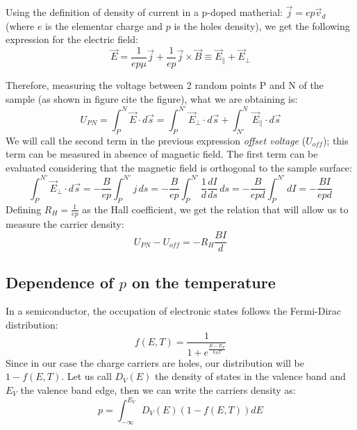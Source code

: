 \documentclass[11pt,a4paper]{article}
\begin{document}
Using the definition of density of current in a p-doped matherial: $\vec{j}=ep\vec{v}_d$ (where $e$ is the elementar charge and $p$ is the holes density), we get the following expression for the electric field:
\begin{equation}
\vec{E}=\frac{1}{ep\mu}\vec{j}+\frac{1}{ep}\vec{j}\times\vec{B}\equiv \vec{E}_\parallel+\vec{E}_\perp
\end{equation}

Therefore, measuring the voltage between 2 random points P and N of the sample (as shown in figure {\tiny cite the figure}), what we are obtaining is:
\begin{equation}
U_{PN}=\int_P^N\vec{E}\cdot d\vec{s}=\int_P^{N'}\vec{E}_\perp\cdot d\vec{s}+\int_{N'}^N\vec{E}_\parallel\cdot d\vec{s}
\end{equation}
We will call the second term in the previous expression \emph{offset voltage} ($U_{off}$); this term can be measured in absence of magnetic field. The first term can be evaluated considering that the magnetic field is orthogonal to the sample surface:
\begin{equation}
\int_P^{N'}\vec{E}_\perp\cdot d\vec{s}=-\frac{B}{ep}\int_P^{N'}j\, ds=-\frac{B}{ep}\int_P^{N'}\frac{1}{d}\frac{dI}{ds}\, ds=-\frac{B}{epd}\int_P^{N'} dI=-\frac{BI}{epd}
\end{equation}
Defining $R_H=\frac{1}{ep}$ as the Hall coefficient, we get the relation that will allow us to measure the carrier density:
\begin{equation}
U_{PN}-U_{off}=-R_H\frac{BI}{d}
\end{equation}
\subsection{Dependence of $p$ on the temperature}
In a semiconductor, the occupation of electronic states follows the Fermi-Dirac distribution:
\begin{equation*}
f(E,T)=\frac{1}{1+e^{\frac{E-E_F}{k_BT}}}
\end{equation*}
Since in our case the charge carriers are holes, our distribution will be $1-f(E,T)$. Let us call $D_V(E)$ the density of states in the valence band and $E_V$ the valence band edge, then we can write the carriers density as:
\begin{equation}
p=\int_{-\infty}^{E_V}D_V(E)(1-f(E,T))dE
\end{equation}
\end{document}
